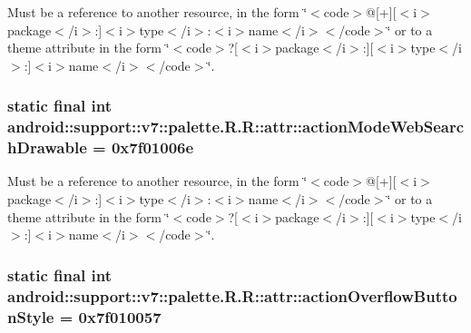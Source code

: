 Must be a reference to another resource, in the form \char`\"{}$<$code$>$@\mbox{[}+\mbox{]}\mbox{[}$<$i$>$package$<$/i$>$:\mbox{]}$<$i$>$type$<$/i$>$:$<$i$>$name$<$/i$>$$<$/code$>$\char`\"{} or to a theme attribute in the form \char`\"{}$<$code$>$?\mbox{[}$<$i$>$package$<$/i$>$:\mbox{]}\mbox{[}$<$i$>$type$<$/i$>$:\mbox{]}$<$i$>$name$<$/i$>$$<$/code$>$\char`\"{}. \hypertarget{classandroid_1_1support_1_1v7_1_1palette_1_1_r_1_1attr_92b52fd596be2d8b389edc7dcaf2b6cd}{
\subsubsection[{actionModeWebSearchDrawable}]{\setlength{\rightskip}{0pt plus 5cm}static final int android::support::v7::palette.R.R::attr::actionModeWebSearchDrawable = 0x7f01006e}}
\label{classandroid_1_1support_1_1v7_1_1palette_1_1_r_1_1attr_92b52fd596be2d8b389edc7dcaf2b6cd}


Must be a reference to another resource, in the form \char`\"{}$<$code$>$@\mbox{[}+\mbox{]}\mbox{[}$<$i$>$package$<$/i$>$:\mbox{]}$<$i$>$type$<$/i$>$:$<$i$>$name$<$/i$>$$<$/code$>$\char`\"{} or to a theme attribute in the form \char`\"{}$<$code$>$?\mbox{[}$<$i$>$package$<$/i$>$:\mbox{]}\mbox{[}$<$i$>$type$<$/i$>$:\mbox{]}$<$i$>$name$<$/i$>$$<$/code$>$\char`\"{}. \hypertarget{classandroid_1_1support_1_1v7_1_1palette_1_1_r_1_1attr_85585aafea885e950c2e23a69ec8df57}{
\subsubsection[{actionOverflowButtonStyle}]{\setlength{\rightskip}{0pt plus 5cm}static final int android::support::v7::palette.R.R::attr::actionOverflowButtonStyle = 0x7f010057}}
\label{classandroid_1_1support_1_1v7_1_1palette_1_1_r_1_1attr_85585aafea885e950c2e23a69ec8df57}


